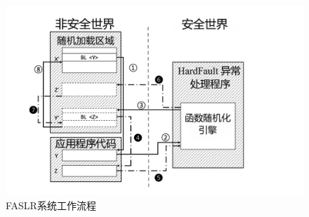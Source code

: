 \documentclass[UTF8,12pt,a4paper]{ctexart}
\numberwithin{figure}{section}
\begin{document}
\begin{figure}[H]
    \centering
    \includegraphics[scale=0.4]{graph/workflow.png}
    \caption{FASLR系统工作流程}
    \label{fig:workflow}
\end{figure}
\end{document}
